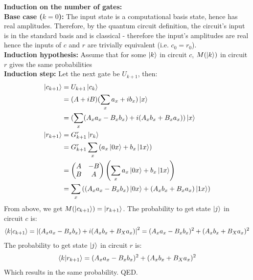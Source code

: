 \textbf{Induction on the number of gates:}\\
\textbf{Base case ($k=0$):} The input state is a computational basis state, hence has real amplitudes.
Therefore, by the quantum circuit definition, the circuit's input is in the standard basis and is classical - therefore the input's amplitudes are real hence the inputs of $c$ and $r$ are trivially equivalent (i.e. $c_0=r_0$).\\
\textbf{Induction hypothesis:} Assume that for some $\ket{k}$ in circuit $c$, $M(\ket{k})$ in circuit $r$ gives the same probabilities\\
\textbf{Induction step:} Let the next gate be $U_{k+1}$, then:\\
\begin{align*}
    \ket{c_{k+1}}&=U_{k+1}\ket{c_k}\\
    &=(A+iB)(\sum_x a_x+ib_x)\ket{x}\\
    &=(\sum_x(A_x a_x-B_x b_x)+i(A_x b_x+B_x a_x))\ket{x}\\
    \ket{r_{k+1}}&=G_{k+1}^r\ket{r_k}\\
    &=G_{k+1}^r\sum_x \left(a_x\ket{0x}+b_x\ket{1x}\right)\\
    &=\left(\begin{matrix*}
                A & -B\\
                B & A\\
    \end{matrix*}\right)\left(\sum_x a_x\ket{0x}+b_x\ket{1x}\right)\\
    &=\sum_x \left((A_x a_x-B_x b_x)\ket{0x}+(A_x b_x +B_x a_x)\ket{1x}\right)\\
\end{align*}
From above, we get $M(\ket{c_{k+1}})=\ket{r_{k+1}}$.
The probability to get state $\ket{j}$ in circuit $c$ is:
\begin{equation*}
    \braket{k}{c_{k+1}}=\abs{(A_x a_x-B_x b_x)+i(A_x b_x+B_X a_x)}^2=(A_x a_x-B_x b_x)^2+(A_x b_x+B_X a_x)^2
\end{equation*}
The probability to get state $\ket{j}$ in circuit $r$ is:
\begin{equation*}
    \braket{k}{r_{k+1}}=(A_x a_x-B_x b_x)^2+(A_x b_x+B_X a_x)^2
\end{equation*}
Which results in the same probability.
QED\@.
